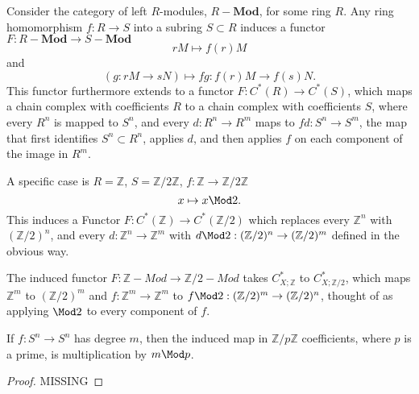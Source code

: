 Consider the category of left $R$-modules, $R-\mathbf{Mod}$, for some ring $R$. Any ring homomorphism $f:R\rightarrow S$ into a subring $S\subset R$ induces a functor $F:R-\mathbf{Mod}\rightarrow S-\mathbf{Mod}$ $$rM\mapsto f(r)M$$ and
$$(g:rM\rightarrow sN)\mapsto fg:f(r)M\rightarrow f(s)N.$$ This functor furthermore extends to a functor $F:C^*(R)\rightarrow C^*(S)$, which maps a chain complex with coefficients $R$ to a chain complex with coefficients $S$, where every $R^n$ is mapped to $S^n$, and every $d:R^n\rightarrow R^m$ maps to $fd:S^n\rightarrow S^m$, the map that first identifies $S^n\subset R^n$, applies $d$, and then applies $f$ on each component of the image in $R^m$.

A specific case is $R=\mathbb{Z}$, $S=\mathbb{Z}/2\mathbb{Z}$, $f:\mathbb{Z}\rightarrow \mathbb{Z}/2\mathbb{Z}$ $$x\mapsto x\Mod 2.$$ This induces a Functor $F:C^*(\mathbb{Z})\rightarrow C^*(\mathbb{Z}/2)$ which replaces every $\mathbb{Z}^n$ with $(\mathbb{Z}/2)^n$, and every $d:\mathbb{Z}^n\rightarrow \mathbb{Z}^m$ with $d\Mod 2:(\mathbb{Z}/2)^n\rightarrow (\mathbb{Z}/2)^m$ defined in the obvious way. 

The induced functor $F:\mathbb{Z}-Mod\rightarrow \mathbb{Z}/2-Mod$ takes $C^*_{X;\mathbb{Z}}$ to $C^*_{X;\mathbb{Z}/2}$, which maps $\mathbb{Z}^m$ to $(\mathbb{Z}/2)^m$ and $f:\mathbb{Z}^m\rightarrow \mathbb{Z}^m$ to $f\Mod 2:(\mathbb{Z}/2)^m\rightarrow (\mathbb{Z}/2)^n$, thought of as applying $\Mod 2$ to every component of $f$.

\begin{proposition}
If $f:S^n\rightarrow S^n$ has degree $m$, then the induced map in $\mathbb{Z}/p\mathbb{Z}$ coefficients, where $p$ is a prime, is multiplication by $m \Mod p$.
\end{proposition}
\begin{proof}
MISSING
\end{proof}
